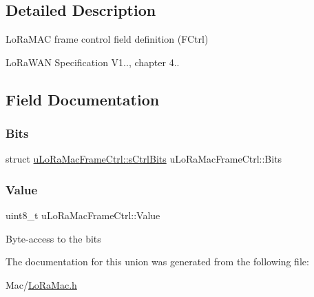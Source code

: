 \subsection{Detailed Description}
Lo\+Ra\+M\+AC frame control field definition (F\+Ctrl)

Lo\+Ra\+W\+AN Specification V1.., chapter 4.. 

\subsection{Field Documentation}
\mbox{\label{unionuLoRaMacFrameCtrl_aceae433bef08dcb31c0972b204f88e68}} 
\subsubsection{\texorpdfstring{Bits}{Bits}}
{\footnotesize\ttfamily struct \hyperlink{structuLoRaMacFrameCtrl_1_1sCtrlBits}{u\+Lo\+Ra\+Mac\+Frame\+Ctrl\+::s\+Ctrl\+Bits} u\+Lo\+Ra\+Mac\+Frame\+Ctrl\+::\+Bits}

\mbox{\label{unionuLoRaMacFrameCtrl_a19009e145545052c0786ce3d9337aead}} 
\subsubsection{\texorpdfstring{Value}{Value}}
{\footnotesize\ttfamily uint8\+\_\+t u\+Lo\+Ra\+Mac\+Frame\+Ctrl\+::\+Value}

Byte-\/access to the bits 

The documentation for this union was generated from the following file\+:\begin{DoxyCompactItemize}
\item 
Mac/\hyperlink{LoRaMac_8h}{Lo\+Ra\+Mac.\+h}\end{DoxyCompactItemize}
